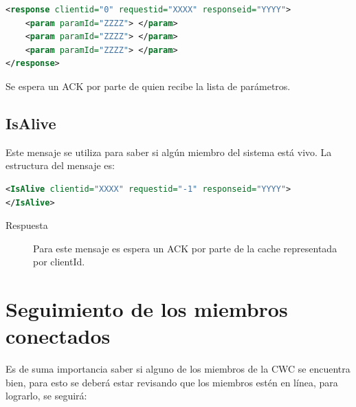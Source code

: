 \begin{lstlisting}[language=XML,caption=Mensaje de Respuesta de GetConfParams]
<response clientid="0" requestid="XXXX" responseid="YYYY"> 
	<param paramId="ZZZZ"> </param>
	<param paramId="ZZZZ"> </param>
	<param paramId="ZZZZ"> </param>
</response>
\end{lstlisting}


Se espera un ACK por parte de quien recibe la lista de parámetros.

\subsection{IsAlive}

Este mensaje se utiliza para saber si algún miembro del sistema está vivo. La estructura del mensaje es:

\begin{lstlisting}[language=XML,caption=Mensaje de IsAlive]
<IsAlive clientid="XXXX" requestid="-1" responseid="YYYY"> 
</IsAlive>
\end{lstlisting}

\begin{description}
\item[Respuesta] Para este mensaje es espera un ACK por parte de la cache representada por clientId.
\end{description}

\section{Seguimiento de los miembros conectados}

Es de suma importancia saber si alguno de los miembros de la CWC se encuentra bien, para esto se deberá estar revisando que los miembros estén en línea, para lograrlo, se seguirá:

